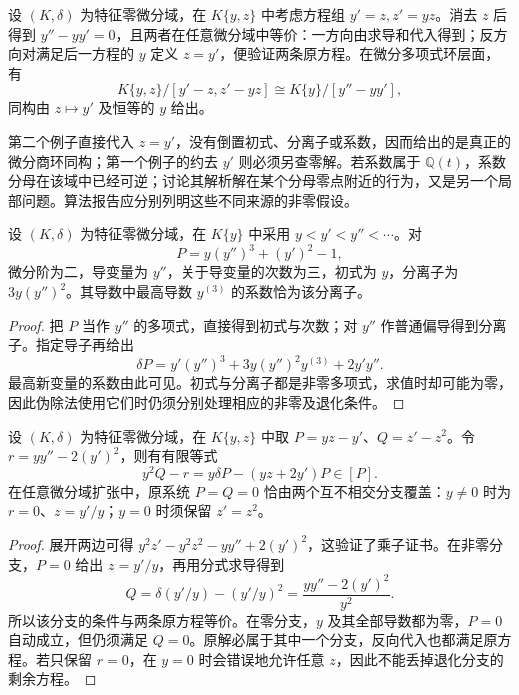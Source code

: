 \begin{example}[消去隐藏变量]\label{b3:exm:differential-elimination-system}
	设 \((K,\delta)\) 为特征零微分域，在 \(K\{y,z\}\) 中考虑方程组 \(y'=z,z'=yz\)。消去 \(z\) 后得到 \(y''-yy'=0\)，且两者在任意微分域中等价：一方向由求导和代入得到；反方向对满足后一方程的 \(y\) 定义 \(z=y'\)，便验证两条原方程。在微分多项式环层面，有
	\[
		K\{y,z\}/[y'-z,z'-yz]\cong K\{y\}/[y''-yy'],
	\]
	同构由 \(z\mapsto y'\) 及恒等的 \(y\) 给出。
\end{example}

第二个例子直接代入 \(z=y'\)，没有倒置初式、分离子或系数，因而给出的是真正的微分商环同构；第一个例子的约去 \(y'\) 则必须另查零解。若系数属于 \(\mathbb Q(t)\)，系数分母在该域中已经可逆；讨论其解析解在某个分母零点附近的行为，又是另一个局部问题。算法报告应分别列明这些不同来源的非零假设。


\begin{example}\label{b3:exm:E-initial-separant}
	设 \((K,\delta)\) 为特征零微分域，在 \(K\{y\}\) 中采用 \(y<y'<y''<\cdots\)。对
	\[
		P=y(y'')^3+(y')^2-1,
	\]
	微分阶为二，导变量为 \(y''\)，关于导变量的次数为三，初式为 \(y\)，分离子为 \(3y(y'')^2\)。其导数中最高导数 \(y^{(3)}\) 的系数恰为该分离子。
\end{example}
\begin{proof}
	把 \(P\) 当作 \(y''\) 的多项式，直接得到初式与次数；对 \(y''\) 作普通偏导得到分离子。指定导子再给出
	\[
		\delta P=y'(y'')^3+3y(y'')^2y^{(3)}+2y'y''.
	\]
	最高新变量的系数由此可见。初式与分离子都是非零多项式，求值时却可能为零，因此伪除法使用它们时仍须分别处理相应的非零及退化条件。
\end{proof}

\begin{example}\label{b3:exm:E-branch-certificate}
	设 \((K,\delta)\) 为特征零微分域，在 \(K\{y,z\}\) 中取 \(P=yz-y'\)、\(Q=z'-z^2\)。令 \(r=yy''-2(y')^2\)，则有有限等式
	\[
		y^2Q-r=y\delta P-(yz+2y')P\in[P].
	\]
	在任意微分域扩张中，原系统 \(P=Q=0\) 恰由两个互不相交分支覆盖：\(y\ne0\) 时为 \(r=0\)、\(z=y'/y\)；\(y=0\) 时须保留 \(z'=z^2\)。
\end{example}
\begin{proof}
	展开两边可得 \(y^2z'-y^2z^2-yy''+2(y')^2\)，这验证了乘子证书。在非零分支，\(P=0\) 给出 \(z=y'/y\)，再用分式求导得到
	\[
		Q=\delta(y'/y)-(y'/y)^2=\dfrac{yy''-2(y')^2}{y^2}.
	\]
	所以该分支的条件与两条原方程等价。在零分支，\(y\) 及其全部导数都为零，\(P=0\) 自动成立，但仍须满足 \(Q=0\)。原解必属于其中一个分支，反向代入也都满足原方程。若只保留 \(r=0\)，在 \(y=0\) 时会错误地允许任意 \(z\)，因此不能丢掉退化分支的剩余方程。
\end{proof}
